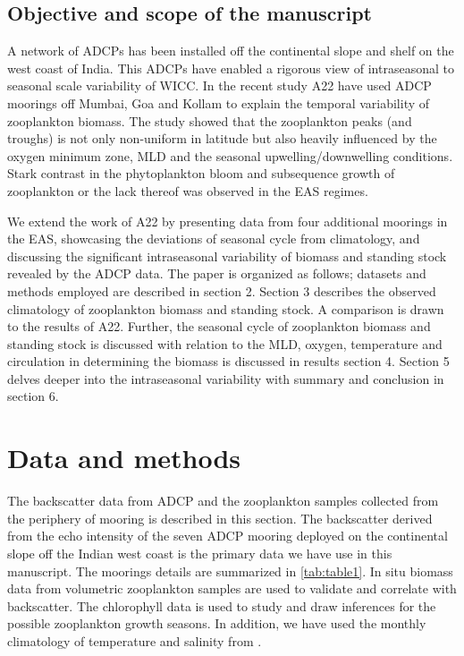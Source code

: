 \documentclass{article}
\begin{document}
	\subsection{Objective and scope of the manuscript}
	
	A network of ADCPs has been installed off the continental slope and shelf on the west coast of India. This ADCPs have enabled a rigorous view of intraseasonal to seasonal scale variability \citep{amol2014observed, chaudhuri2020observed} of WICC. In the recent study A22 have used ADCP moorings off  Mumbai, Goa and Kollam to explain the temporal variability of zooplankton biomass. The study showed that the zooplankton peaks (and troughs) is not only non-uniform in latitude but also heavily influenced by the oxygen minimum zone, MLD and the seasonal upwelling/downwelling conditions. Stark contrast in the phytoplankton bloom and subsequence  growth of zooplankton or the lack thereof was observed in the EAS regimes.
	
    We extend the work of A22 by presenting data from four additional moorings in the EAS, showcasing the deviations of seasonal cycle from climatology, and discussing the significant intraseasonal variability of biomass and standing stock revealed by the ADCP data. The paper is organized as follows; datasets and methods employed are described in section 2. Section 3 describes the observed climatology of zooplankton biomass and standing stock. A comparison is drawn to the results of A22. Further, the seasonal cycle of zooplankton biomass and standing stock is discussed with relation to the MLD, oxygen, temperature and circulation in determining the biomass is discussed in results section 4. Section 5 delves deeper into the intraseasonal variability with summary and conclusion in section 6.
	
	\section{Data and methods}
	The  backscatter data from ADCP and the zooplankton samples collected from the periphery of mooring is described in this section. The backscatter derived from the echo intensity of the seven ADCP mooring deployed on the continental slope off the Indian west coast is the primary data we have use in this manuscript. The moorings details are summarized in \autoref{tab:table1}. In situ biomass data from volumetric zooplankton samples are used to validate and correlate with backscatter. The chlorophyll data is used to study and draw inferences for the possible zooplankton growth seasons. In addition, we have used the monthly climatology of temperature and salinity from \citet{chatterjee2012new}. 
	
\end{document}
